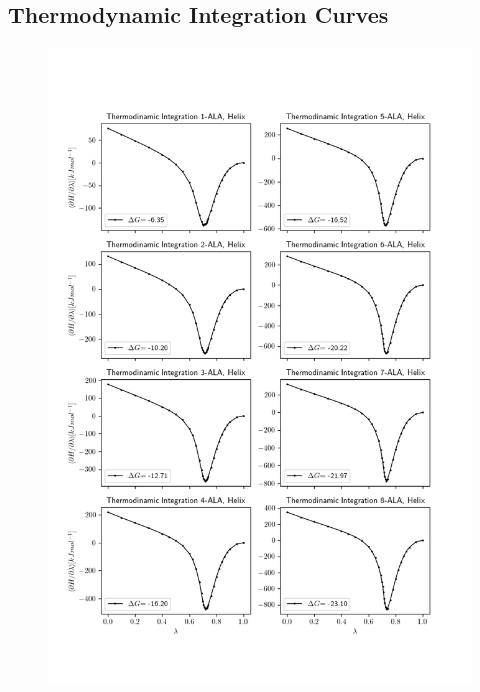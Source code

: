 \subsection*{Thermodynamic Integration Curves}\label{subsec:TI_curves}
\begin{figure}[h!]
    \centering
    \includegraphics[scale=0.75]{Figures/Chapter_7/TI_curves_1.png}
    \label{fig:my_label}
\end{figure}
